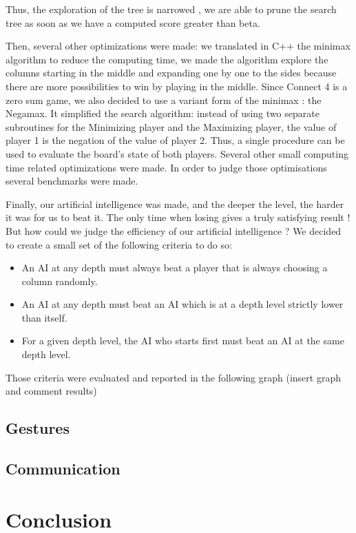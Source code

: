 \documentclass[12pt, a4paper, oneside]{report}
\begin{document}
	Thus, the exploration of the tree is narrowed , we are able to prune the search tree as soon as we have a computed score greater than beta.

	Then, several other optimizations were made: we translated in C++ the minimax algorithm to reduce the computing time, we made the algorithm explore the columns starting in the middle and expanding one by one to the sides because there are more possibilities to win by playing in the middle. 
	Since Connect 4 is a zero sum game, we also decided to use a variant form of the minimax : the Negamax. It simplified the search algorithm: instead of using two separate subroutines for the Minimizing player and the Maximizing player, the value of player 1 is the negation of the value of player 2. Thus, a single procedure can be used to evaluate the board’s state of both players.
	Several other small computing time related optimizations were made. In order to judge those optimisations several benchmarks were made.


	Finally, our artificial intelligence was made, and the deeper the level, the harder it was for us to beat it. The only time when losing gives a truly satisfying result ! But how could we judge the efficiency of our artificial intelligence ? We decided to create a small set of the following criteria to do so:
	\begin{itemize}
		\item An AI at any depth must always beat a player that is always choosing a column randomly.
		\item An AI at any depth must beat an AI which is at a depth level strictly lower than itself.
		\item For a given depth level, the AI who starts first must beat an AI at the same depth level.
	\end{itemize}

	Those criteria were evaluated and reported in the following graph (insert graph and comment results) \\

	\section{Gestures}

	\section{Communication}

	\chapter{Conclusion}
\end{document}
